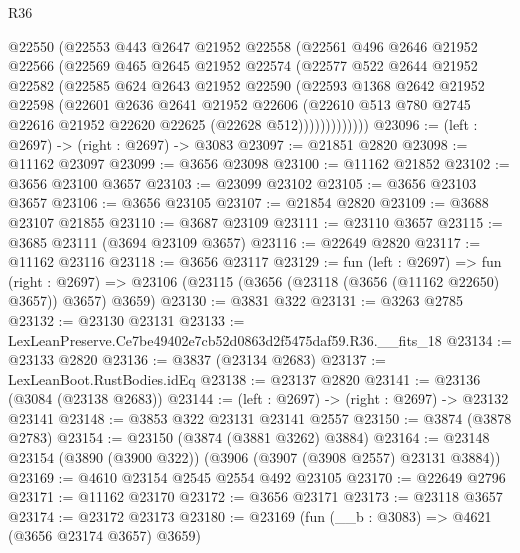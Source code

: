 \begin{lexlean}{R36}
\begin{coremodule}
            @22550
            (@22553
              @443
              @2647
              @21952
              @22558
              (@22561
                @496
                @2646
                @21952
                @22566
                (@22569
                  @465
                  @2645
                  @21952
                  @22574
                  (@22577
                    @522
                    @2644
                    @21952
                    @22582
                    (@22585
                      @624
                      @2643
                      @21952
                      @22590
                      (@22593
                        @1368
                        @2642
                        @21952
                        @22598
                        (@22601
                          @2636
                          @2641
                          @21952
                          @22606
                          (@22610
                            @513
                            @780
                            @2745
                            @22616
                            @21952
                            @22620
                            @22625
                            (@22628 @512)))))))))))))
@23096 := (left : @2697) -> (right : @2697) -> @3083
@23097 := @21851 @2820
@23098 := @11162 @23097
@23099 := @3656 @23098
@23100 := @11162 @21852
@23102 := @3656 @23100 @3657
@23103 := @23099 @23102
@23105 := @3656 @23103 @3657
@23106 := @3656 @23105
@23107 := @21854 @2820
@23109 := @3688 @23107 @21855
@23110 := @3687 @23109
@23111 := @23110 @3657
@23115 := @3685 @23111 (@3694 @23109 @3657)
@23116 := @22649 @2820
@23117 := @11162 @23116
@23118 := @3656 @23117
@23129 := fun (left : @2697) =>
  fun (right : @2697) => @23106 (@23115 (@3656 (@23118 (@3656 (@11162 @22650) @3657)) @3657) @3659)
@23130 := @3831 @322
@23131 := @3263 @2785
@23132 := @23130 @23131
@23133 := LexLeanPreserve.Ce7be49402e7cb52d0863d2f5475daf59.R36.__fits_18
@23134 := @23133 @2820
@23136 := @3837 (@23134 @2683)
@23137 := LexLeanBoot.RustBodies.idEq
@23138 := @23137 @2820
@23141 := @23136 (@3084 (@23138 @2683))
@23144 := (left : @2697) -> (right : @2697) -> @23132 @23141
@23148 := @3853 @322 @23131 @23141 @2557
@23150 := @3874 (@3878 @2783)
@23154 := @23150 (@3874 (@3881 @3262) @3884)
@23164 := @23148 @23154 (@3890 (@3900 @322)) (@3906 (@3907 (@3908 @2557) @23131 @3884))
@23169 := @4610 @23154 @2545 @2554 @492 @23105
@23170 := @22649 @2796
@23171 := @11162 @23170
@23172 := @3656 @23171
@23173 := @23118 @3657
@23174 := @23172 @23173
@23180 := @23169 (fun (__b : @3083) => @4621 (@3656 @23174 @3657) @3659)

\end{coremodule}
\end{lexlean}
